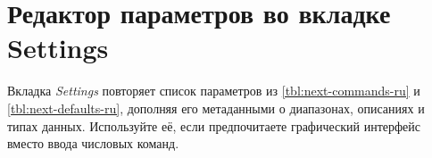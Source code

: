 \section{Редактор параметров во вкладке Settings}
Вкладка \emph{Settings} повторяет список параметров из \autoref{tbl:next-commands-ru} и \autoref{tbl:next-defaults-ru}, дополняя его метаданными о диапазонах, описаниях и типах данных.
Используйте её, если предпочитаете графический интерфейс вместо ввода числовых команд.
